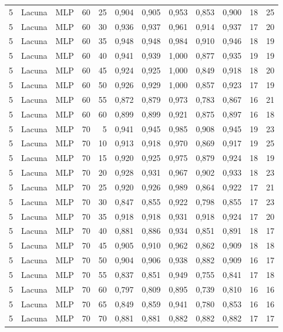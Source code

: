 \begin{longtable}{@{}rllrrrrrrrrr@{}}
5 & Lacuna & MLP & 60 & 25 & 0,904 & 0,905 & 0,953 & 0,853 & 0,900 & 18 & 25 \\
5 & Lacuna & MLP & 60 & 30 & 0,936 & 0,937 & 0,961 & 0,914 & 0,937 & 17 & 20 \\
5 & Lacuna & MLP & 60 & 35 & 0,948 & 0,948 & 0,984 & 0,910 & 0,946 & 18 & 19 \\
5 & Lacuna & MLP & 60 & 40 & 0,941 & 0,939 & 1,000 & 0,877 & 0,935 & 19 & 19 \\
5 & Lacuna & MLP & 60 & 45 & 0,924 & 0,925 & 1,000 & 0,849 & 0,918 & 18 & 20 \\
5 & Lacuna & MLP & 60 & 50 & 0,926 & 0,929 & 1,000 & 0,857 & 0,923 & 17 & 19 \\
5 & Lacuna & MLP & 60 & 55 & 0,872 & 0,879 & 0,973 & 0,783 & 0,867 & 16 & 21 \\
5 & Lacuna & MLP & 60 & 60 & 0,899 & 0,899 & 0,921 & 0,875 & 0,897 & 16 & 18 \\
5 & Lacuna & MLP & 70 & 5 & 0,941 & 0,945 & 0,985 & 0,908 & 0,945 & 19 & 23 \\
5 & Lacuna & MLP & 70 & 10 & 0,913 & 0,918 & 0,970 & 0,869 & 0,917 & 19 & 25 \\
5 & Lacuna & MLP & 70 & 15 & 0,920 & 0,925 & 0,975 & 0,879 & 0,924 & 18 & 19 \\
5 & Lacuna & MLP & 70 & 20 & 0,928 & 0,931 & 0,967 & 0,902 & 0,933 & 18 & 23 \\
5 & Lacuna & MLP & 70 & 25 & 0,920 & 0,926 & 0,989 & 0,864 & 0,922 & 17 & 21 \\
5 & Lacuna & MLP & 70 & 30 & 0,847 & 0,855 & 0,922 & 0,798 & 0,855 & 17 & 23 \\
5 & Lacuna & MLP & 70 & 35 & 0,918 & 0,918 & 0,931 & 0,918 & 0,924 & 17 & 20 \\
5 & Lacuna & MLP & 70 & 40 & 0,881 & 0,886 & 0,934 & 0,851 & 0,891 & 18 & 17 \\
5 & Lacuna & MLP & 70 & 45 & 0,905 & 0,910 & 0,962 & 0,862 & 0,909 & 18 & 18 \\
5 & Lacuna & MLP & 70 & 50 & 0,904 & 0,906 & 0,938 & 0,882 & 0,909 & 16 & 17 \\
5 & Lacuna & MLP & 70 & 55 & 0,837 & 0,851 & 0,949 & 0,755 & 0,841 & 17 & 18 \\
5 & Lacuna & MLP & 70 & 60 & 0,797 & 0,809 & 0,895 & 0,739 & 0,810 & 16 & 16 \\
5 & Lacuna & MLP & 70 & 65 & 0,849 & 0,859 & 0,941 & 0,780 & 0,853 & 16 & 16 \\
5 & Lacuna & MLP & 70 & 70 & 0,881 & 0,881 & 0,882 & 0,882 & 0,882 & 17 & 17 \\

\end{longtable}
